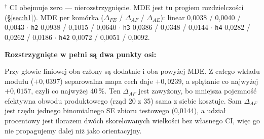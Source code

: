\documentclass[11pt, a4paper]{article}
\begin{document}
\begin{table}[H]
\centering
\footnotesize
\renewcommand{\arraystretch}{1.3}
\setlength{\tabcolsep}{4pt}
\begin{minipage}{\textwidth}
\footnotesize $^\dagger$ CI obejmuje zero --- nierozstrzygnięcie. MDE jest tu progiem rozdzielczości (\S\ref{sec:h1}). MDE per komórka ($\Delta_{FE}$ / $\Delta_{AF}$ / $\Delta_{AE}$): linear 0,0038 / 0,0040 / 0,0043 $\cdot$ \texttt{h2} 0,0938 / 0,1015 / 0,0640 $\cdot$ \texttt{h3} 0,0386 / 0,0348 / 0,0144 $\cdot$ \texttt{h4} 0,0282 / 0,0262 / 0,0186 $\cdot$ \texttt{h42} 0,0072 / 0,0051 / 0,0092.
\end{minipage}
\end{table}

\textbf{Rozstrzygnięte w pełni są dwa punkty osi:}

Przy głowie liniowej oba człony są dodatnie i oba powyżej MDE. Z całego wkładu modułu ($+0{,}0397$) separowalna mapa cech daje $+0{,}0239$, a splątanie co najwyżej $+0{,}0157$, czyli co najwyżej 40\,\%. Ten $\Delta_{AF}$ jest zawyżony, bo mniejsza pojemność efektywna obwodu produktowego (rząd 20 z 35) sama z siebie kosztuje. Sam $\Delta_{AF}$ jest rzędu jednego binomialnego SE zbioru testowego (0,0144), a udział procentowy jest ilorazem dwóch skorelowanych wielkości bez własnego CI, więc go nie propagujemy dalej niż jako orientacyjny.
\end{document}
